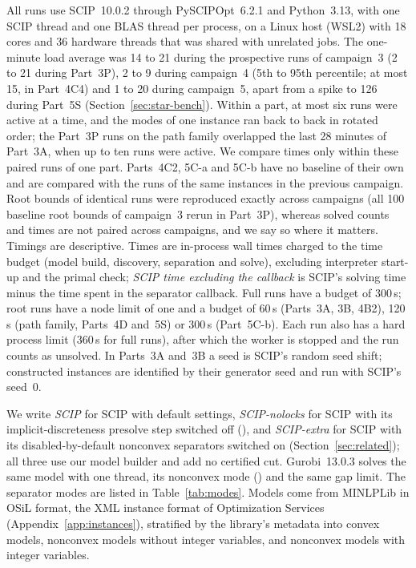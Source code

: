 All runs use SCIP~10.0.2 through PySCIPOpt~6.2.1 and Python~3.13, with one
SCIP thread and one BLAS thread per process, on a Linux host (WSL2) with 18
cores and 36 hardware threads that was shared with unrelated jobs. The
one-minute load average was 14 to 21 during the prospective runs of
campaign~3 (2 to 21 during Part~3P), 2 to 9 during campaign~4 (5th to 95th
percentile; at most 15, in Part~4C4) and 1 to 20 during campaign~5, apart from
a spike to 126 during Part~5S (Section~\ref{sec:star-bench}). Within a
part, at most six runs were active at a time, and the modes of one instance
ran back to back in rotated order; the Part~3P runs on the path family
overlapped the last 28 minutes of Part~3A, when up to ten runs were active. We
compare times only within these paired runs of one part. Parts~4C2, 5C-a and
5C-b have no baseline of their own and are compared with the runs of the same
instances in the previous campaign. Root bounds of identical runs were
reproduced exactly across campaigns (all 100 baseline root bounds of campaign~3
rerun in Part~3P), whereas solved counts and times are not paired across
campaigns, and we say so where it matters. Timings
are descriptive. Times are in-process wall times charged to the time budget
(model build, discovery, separation and solve), excluding interpreter start-up
and the primal check; \emph{SCIP time excluding the callback} is SCIP's solving
time minus the time spent in the separator callback. Full runs have a budget of
300\,s; root runs have a node limit of one and a budget of 60\,s (Parts~3A, 3B,
4B2), 120\,s (path family, Parts~4D and~5S) or 300\,s (Part~5C-b). Each run also
has a hard process limit (360\,s for full runs), after which the worker is
stopped and the run counts as unsolved. In Parts~3A and~3B a seed is
SCIP's random seed shift; constructed instances are identified by their
generator seed and run with SCIP's seed~0.

We write \emph{SCIP} for SCIP with default settings, \emph{SCIP-nolocks} for SCIP
with its implicit-discreteness presolve step switched off
(), and \emph{SCIP-extra} for SCIP
with its disabled-by-default nonconvex separators switched on
(Section~\ref{sec:related}); all three use our model builder and add no
certified cut. Gurobi~13.0.3 \citep{Gurobi13} solves the same model with one
thread, its nonconvex mode () and the same gap limit. The
separator modes are listed in Table~\ref{tab:modes}. Models come from MINLPLib
\citep{BussieckDrudMeeraus2003,Vigerske2026MINLPLib} in OSiL format, the XML
instance format of Optimization Services (Appendix~\ref{app:instances}),
stratified by the library's metadata into convex models, nonconvex models
without integer variables, and nonconvex models with integer variables.

